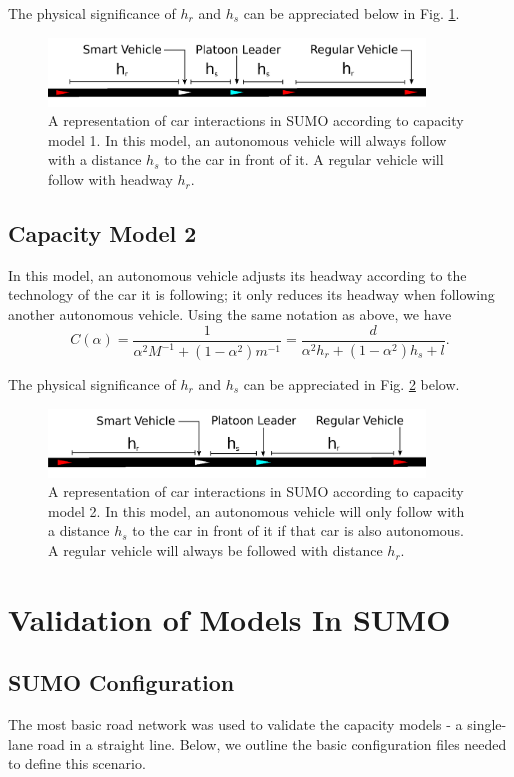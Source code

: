 \documentclass[11pt,nofootinbib]{revtex4}
\begin{document}
The physical significance of $h_r$ and $h_s$ can be appreciated below in Fig. \ref{headways_1}. 
\begin{figure}[h]
\centering
\includegraphics[width = 100mm]{images/headways_model1.png}
\caption{A representation of car interactions in SUMO according to capacity model 1. In this model, an autonomous vehicle will always follow with a distance $h_s$ to the car in front of it. A regular vehicle will follow with headway $h_r$.}
\label{headways_1}
\end{figure}

\subsection{Capacity Model 2}
In this model, an autonomous vehicle adjusts its headway according to the technology of the car it is following; it only reduces its headway when following another autonomous vehicle. Using the same notation as above, we have
\begin{equation}
    C(\alpha) = \frac{1}{\alpha^2 M^{-1} + (1-\alpha^2)m^{-1}} = \frac{d}{\alpha^2 h_r + (1-\alpha^2)h_s + l}. 
\end{equation}

The physical significance of $h_r$ and $h_s$ can be appreciated in Fig. \ref{headways_2} below. 
\begin{figure}[h]
\centering
\includegraphics[width = 100mm]{images/headways_model2.png}
\caption{A representation of car interactions in SUMO according to capacity model 2. In this model, an autonomous vehicle will only follow with a distance $h_s$ to the car in front of it if that car is also autonomous. A regular vehicle will always be followed with distance $h_r$.}
\label{headways_2}
\end{figure}


\section{Validation of Models In SUMO}

\subsection{SUMO Configuration}
The most basic road network was used to validate the capacity models - a single-lane road in a straight line. Below, we outline the basic configuration files needed to define this scenario. 
\end{document}
